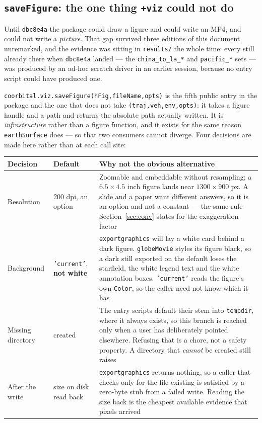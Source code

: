 \documentclass[11pt]{article}
\newcommand{\code}[1]{\texttt{#1}}
\newcommand{\pkg}[1]{\texttt{+#1}}
\begin{document}
\subsection{\code{saveFigure}: the one thing \pkg{viz} could not do}

Until \code{dbc8e4a} the package could draw a figure and could write an MP4,
and could not write a \emph{picture}. That gap survived three editions of this
document unremarked, and the evidence was sitting in \code{results/} the whole
time: every still already there when \code{dbc8e4a} landed --- the
\code{china\_to\_la\_*} and \code{pacific\_*} sets --- was produced by an ad-hoc
scratch driver in an earlier session, because no entry script could have
produced one.

\code{coorbital.viz.saveFigure(hFig,fileName,opts)} is the fifth public entry in
the package and the one that does not take \code{(traj,veh,env,opts)}: it takes
a figure handle and a path and returns the absolute path actually written. It is
\emph{infrastructure} rather than a figure function, and it exists for the same
reason \code{earthSurface} does --- so that two consumers cannot diverge. Four
decisions are made here rather than at each call site:

\begin{center}
\begin{tabular}{lp{4.0cm}p{6.4cm}}
\toprule
Decision & Default & Why not the obvious alternative \\
\midrule
Resolution & 200 dpi, an option & Zoomable and embeddable without resampling; a $6.5\times4.5$ inch figure lands near $1300\times900$ px. A slide and a paper want different answers, so it is an option and not a constant --- the same rule Section~\ref{sec:conv} states for the exaggeration factor \\
Background & \code{'current'}, \textbf{not white} & \code{exportgraphics} will lay a white card behind a dark figure. \code{globeMovie} styles its figure black, so a dark still exported on the default loses the starfield, the white legend text and the white annotation boxes. \code{'current'} reads the figure's own \code{Color}, so the caller need not know which it has \\
Missing directory & created & The entry scripts default their stem into \code{tempdir}, where it always exists, so this branch is reached only when a user has deliberately pointed elsewhere. Refusing that is a chore, not a safety property. A directory that \emph{cannot} be created still raises \\
After the write & size on disk read back & \code{exportgraphics} returns nothing, so a caller that checks only for the file existing is satisfied by a zero-byte stub from a failed write. Reading the size back is the cheapest available evidence that pixels arrived \\
\bottomrule
\end{tabular}
\end{center}
\end{document}
